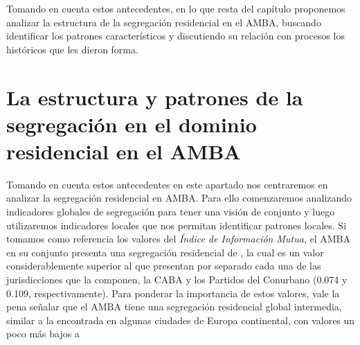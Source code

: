 \documentclass[
  spanish,
  a4paper,%
  chapterprefix=true,%
  DIV=calc,%
  twoside]{scrbook}%
\begin{document}
Tomando en cuenta estos antecedentes, en lo que resta del capítulo
proponemos analizar la estructura de la segregación residencial en el
AMBA, buscando identificar los patrones característicos y discutiendo su
relación con procesos los históricos que les dieron forma.

\section{La estructura y patrones de la segregación en el dominio residencial en el AMBA}\label{residential-analysis}

Tomando en cuenta estos antecedentes en este apartado nos centraremos en
analizar la segregación residencial en AMBA. Para ello comenzaremos
analizando indicadores globales de segregación para tener una visión de
conjunto y luego utilizaremos indicadores locales que nos permitan
identificar patrones locales. Si tomamos como referencia
los valores del \emph{Índice de Información Mutua}, el AMBA en su conjunto
presenta una segregación residencial de , la
cual es un valor considerablemente superior al que presentan por
separado cada una de las jurisdicciones que la componen, la CABA y los
Partidos del Conurbano
(0.074 y 0.109,
respectivamente). Para ponderar la
importancia de estos valores, vale la pena señalar que el AMBA tiene una
segregación residencial global intermedia, similar a la encontrada en
algunas ciudades de Europa continental, con valores un poco más bajos a
\end{document}
